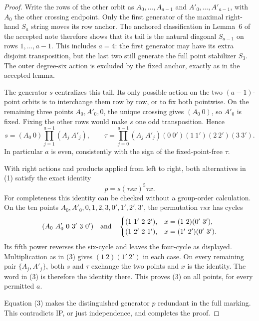 \documentclass[11pt,a4paper]{article}
\begin{document}
\begin{proof}
Write the rows of the other orbit as
$A_0,\ldots,A_{a-1}$ and $A'_0,\ldots,A'_{a-1}$, with
$A_0$ the other crossing endpoint. Only the first generator
of the maximal right-hand $S_a$ string moves its row anchor.
The anchored classification in Lemma~6 of the accepted note
therefore shows that its tail is the natural diagonal
$S_{a-1}$ on rows $1,\ldots,a-1$. This includes $a=4$:
the first generator may have its extra disjoint transposition,
but the last two still generate the full point stabilizer
$S_3$. The outer degree-six action is excluded by the fixed
anchor, exactly as in the accepted lemma.

The generator $s$ centralizes this tail. Its only possible
action on the two $(a-1)$-point orbits is to interchange them
row by row, or to fix both pointwise. On the remaining three
points $A_0,A'_0,0$, the unique crossing gives $(A_0\ 0)$,
so $A'_0$ is fixed. Fixing the other rows would make $s$ one
odd transposition. Hence
\[
 s=(A_0\ 0)\prod_{j=1}^{a-1}(A_j\ A'_j),\qquad
 \tau=\prod_{j=0}^{a-1}(A_j\ A'_j)
            (0\ 0')(1\ 1')(2\ 2')(3\ 3').                 \tag{2}
\]
In particular $a$ is even, consistently with the sign of
the fixed-point-free $\tau$.

With right actions and products applied from left to right,
both alternatives in (1) satisfy the exact identity
\[
                 p=s(\tau s x)^5\tau x.                    \tag{3}
\]
For completeness this identity can be checked without a
group-order calculation. On the ten points
$A_0,A'_0,0,1,2,3,0',1',2',3'$, the permutation $\tau s x$
has cycles
\[
 (A_0\ A'_0\ 0\ 3'\ 3\ 0')
 \quad\hbox{and}\quad
 \begin{cases}
 (1\ 1'\ 2\ 2'),&x=(1\ 2)(0'\ 3'),\\
 (1\ 2'\ 2\ 1'),&x=(1'\ 2')(0'\ 3').
 \end{cases}
\]
Its fifth power reverses the six-cycle and leaves the
four-cycle as displayed. Multiplication as in (3) gives
$(1\ 2)(1'\ 2')$ in each case. On every remaining pair
$\{A_j,A'_j\}$, both $s$ and $\tau$ exchange the two points
and $x$ is the identity. The word in (3) is therefore the
identity there. This proves (3) on all points, for every
permitted $a$.

Equation (3) makes the distinguished generator $p$ redundant
in the full marking. This contradicts IP, or just independence,
and completes the proof.
\end{proof}
\end{document}
